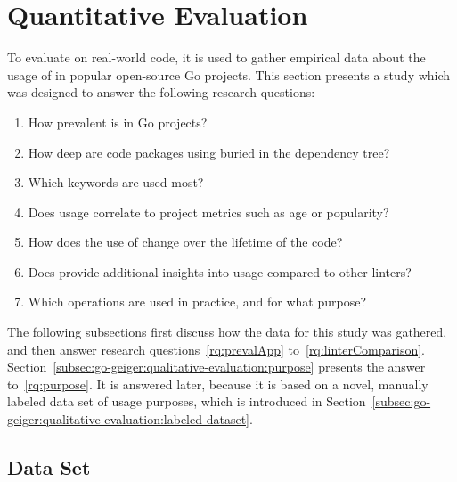 
\section{Quantitative Evaluation}\label{sec:go-geiger:quantitative-evaluation}

To evaluate \toolGeiger{} on real-world code, it is used to gather empirical data about the usage of \unsafe{} in
popular open-source Go projects.
This section presents a study which was designed to answer the following research questions:

\begin{enumerate}[left=0.5cm, label={RQ\arabic*}]
    \item How prevalent is \unsafe{} in Go projects? \label{rq:prevalApp}
    \item How deep are code packages using \unsafe{} buried in the dependency tree? \label{rq:depsDepth}
    \item Which \unsafe{} keywords are used most? \label{rq:distTypes}
    \item Does \unsafe{} usage correlate to project metrics such as age or popularity? \label{rq:popularity}
    \item How does the use of \unsafe{} change over the lifetime of the code? \label{rq:changeTime}
    \item Does \toolGeiger{} provide additional insights into \unsafe{} usage compared to other linters? \label{rq:linterComparison}
    \item Which \unsafe{} operations are used in practice, and for what purpose? \label{rq:purpose}
\end{enumerate}

The following subsections first discuss how the data for this study was gathered, and then answer research
questions~\ref{rq:prevalApp} to~\ref{rq:linterComparison}.
Section~\ref{subsec:go-geiger:qualitative-evaluation:purpose} presents the answer to~\ref{rq:purpose}.
It is answered later, because it is based on a novel, manually labeled data set of \unsafe{} usage purposes, which is
introduced in Section~\ref{subsec:go-geiger:qualitative-evaluation:labeled-dataset}.



\subsection{Data Set}\label{subsec:go-geiger:evaluation:data-set}

